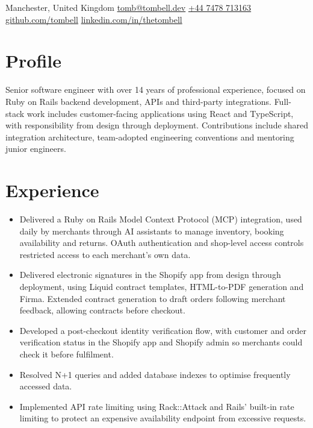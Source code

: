\maketitle

\begin{center}
    \small
    Manchester, United Kingdom
    \enspace\textbar{}\enspace
    \href{mailto:tomb@tombell.dev}{tomb@tombell.dev}
    \enspace\textbar{}\enspace
    \href{tel:+447478713163}{+44 7478 713163}\\[3pt]
    \href{https://github.com/tombell}{github.com/tombell}
    \enspace\textbar{}\enspace
    \href{https://linkedin.com/in/thetombell}{linkedin.com/in/thetombell}
\end{center}

\section{Profile}
Senior software engineer with over 14 years of professional experience, focused on Ruby on Rails backend development, APIs and third-party integrations. Full-stack work includes customer-facing applications using React and TypeScript, with responsibility from design through deployment. Contributions include shared integration architecture, team-adopted engineering conventions and mentoring junior engineers.

\section{Experience}
\begin{itemize}
    \item Delivered a Ruby on Rails Model Context Protocol (MCP) integration, used daily by merchants through AI assistants to manage inventory, booking availability and returns. OAuth authentication and shop-level access controls restricted access to each merchant's own data.
    \item Delivered electronic signatures in the Shopify app from design through deployment, using Liquid contract templates, HTML-to-PDF generation and Firma. Extended contract generation to draft orders following merchant feedback, allowing contracts before checkout.
    \item Developed a post-checkout identity verification flow, with customer and order verification status in the Shopify app and Shopify admin so merchants could check it before fulfilment.
    \item Resolved N+1 queries and added database indexes to optimise frequently accessed data.
    \item Implemented API rate limiting using Rack::Attack and Rails' built-in rate limiting to protect an expensive availability endpoint from excessive requests.
\end{itemize}

